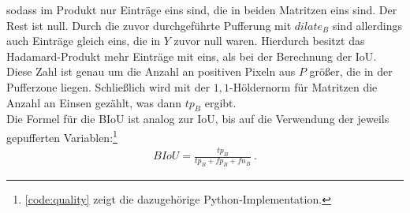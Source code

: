 sodass im Produkt nur Einträge eins sind, die in beiden Matritzen eins sind. Der Rest ist null. 
Durch die zuvor durchgeführte Pufferung mit $dilate_B$ sind allerdings auch Einträge gleich eins, die in $Y$ 
zuvor null waren. Hierdurch besitzt das Hadamard-Produkt mehr Einträge mit eins, als bei der Berechnung der \ac{IoU}.
Diese Zahl ist genau um die Anzahl an positiven Pixeln aus $P$ größer, die in der Pufferzone liegen. 
Schließlich wird mit der $1,1$-Höldernorm für Matritzen die Anzahl an Einsen gezählt, was dann $tp_B$ ergibt. \\
Die Formel für die \ac{BIoU} ist analog zur \ac{IoU}, bis auf die Verwendung der jeweils gepufferten 
Variablen:\footnote{\autoref{code:quality} zeigt die dazugehörige Python-Implementation.}
\begin{align}
	\label{eq:quality} BIoU = \frac{tp_B}{tp_B + fp_B + fn_B} ~.
\end{align}

